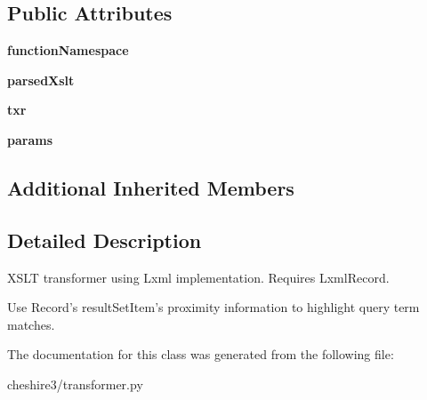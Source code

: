 \subsection*{Public Attributes}
\begin{DoxyCompactItemize}
\item 
\hypertarget{classcheshire3_1_1transformer_1_1_lxml_xslt_transformer_a6dab3c3ac732b6443719c13171f39fcf}{{\bfseries function\-Namespace}}\label{classcheshire3_1_1transformer_1_1_lxml_xslt_transformer_a6dab3c3ac732b6443719c13171f39fcf}

\item 
\hypertarget{classcheshire3_1_1transformer_1_1_lxml_xslt_transformer_adcffae2e0f9998d50c9dc3537d5808a7}{{\bfseries parsed\-Xslt}}\label{classcheshire3_1_1transformer_1_1_lxml_xslt_transformer_adcffae2e0f9998d50c9dc3537d5808a7}

\item 
\hypertarget{classcheshire3_1_1transformer_1_1_lxml_xslt_transformer_abe911a84422ff4f45b2eb18ea9aec90c}{{\bfseries txr}}\label{classcheshire3_1_1transformer_1_1_lxml_xslt_transformer_abe911a84422ff4f45b2eb18ea9aec90c}

\item 
\hypertarget{classcheshire3_1_1transformer_1_1_lxml_xslt_transformer_a659ed1063089105ad573b0973878bd15}{{\bfseries params}}\label{classcheshire3_1_1transformer_1_1_lxml_xslt_transformer_a659ed1063089105ad573b0973878bd15}

\end{DoxyCompactItemize}
\subsection*{Additional Inherited Members}


\subsection{Detailed Description}
\begin{DoxyVerb}XSLT transformer using Lxml implementation. Requires LxmlRecord.

Use Record's resultSetItem's proximity information to highlight query term
matches.
\end{DoxyVerb}
 

The documentation for this class was generated from the following file\-:\begin{DoxyCompactItemize}
\item 
cheshire3/transformer.\-py\end{DoxyCompactItemize}
